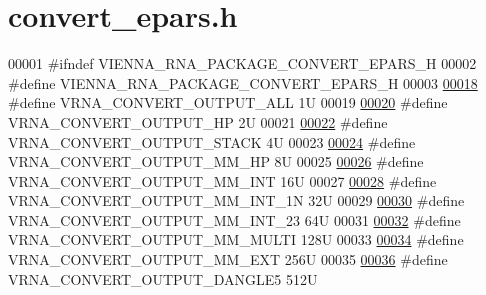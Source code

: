 \hypertarget{convert__epars_8h_source}{}\section{convert\+\_\+epars.\+h}
\label{convert__epars_8h_source}

\begin{DoxyCode}
00001 \textcolor{preprocessor}{#ifndef VIENNA\_RNA\_PACKAGE\_CONVERT\_EPARS\_H}
00002 \textcolor{preprocessor}{#define VIENNA\_RNA\_PACKAGE\_CONVERT\_EPARS\_H}
00003 
\hypertarget{convert__epars_8h_source_l00018}{}\hyperlink{group__energy__parameters__convert_ga8dc6aee5a806c49b71557152f9616bc4}{00018} \textcolor{preprocessor}{#define VRNA\_CONVERT\_OUTPUT\_ALL           1U}
00019 
\hypertarget{convert__epars_8h_source_l00020}{}\hyperlink{group__energy__parameters__convert_gaf66fe2cb11dfcfd32d791049c254a8a4}{00020} \textcolor{preprocessor}{#define VRNA\_CONVERT\_OUTPUT\_HP            2U}
00021 
\hypertarget{convert__epars_8h_source_l00022}{}\hyperlink{group__energy__parameters__convert_gad23522d63f8d4c50d5a5deee9bee3ef2}{00022} \textcolor{preprocessor}{#define VRNA\_CONVERT\_OUTPUT\_STACK         4U}
00023 
\hypertarget{convert__epars_8h_source_l00024}{}\hyperlink{group__energy__parameters__convert_gaa892c7b4957459090f3e08da298cc347}{00024} \textcolor{preprocessor}{#define VRNA\_CONVERT\_OUTPUT\_MM\_HP         8U}
00025 
\hypertarget{convert__epars_8h_source_l00026}{}\hyperlink{group__energy__parameters__convert_ga4ff223fb1f9c62cd92d9ab811ad03d55}{00026} \textcolor{preprocessor}{#define VRNA\_CONVERT\_OUTPUT\_MM\_INT        16U}
00027 
\hypertarget{convert__epars_8h_source_l00028}{}\hyperlink{group__energy__parameters__convert_gaf5d3743219f83c6348155cd81e755bbb}{00028} \textcolor{preprocessor}{#define VRNA\_CONVERT\_OUTPUT\_MM\_INT\_1N     32U}
00029 
\hypertarget{convert__epars_8h_source_l00030}{}\hyperlink{group__energy__parameters__convert_ga78382ec622ba99e0ac2262317bdd7316}{00030} \textcolor{preprocessor}{#define VRNA\_CONVERT\_OUTPUT\_MM\_INT\_23     64U}
00031 
\hypertarget{convert__epars_8h_source_l00032}{}\hyperlink{group__energy__parameters__convert_gae67af9f1cdf7baf2865481282a5d1034}{00032} \textcolor{preprocessor}{#define VRNA\_CONVERT\_OUTPUT\_MM\_MULTI      128U}
00033 
\hypertarget{convert__epars_8h_source_l00034}{}\hyperlink{group__energy__parameters__convert_gaf14ead7ef1fdbe725ade653750fc51e3}{00034} \textcolor{preprocessor}{#define VRNA\_CONVERT\_OUTPUT\_MM\_EXT        256U}
00035 
\hypertarget{convert__epars_8h_source_l00036}{}\hyperlink{group__energy__parameters__convert_ga036ffd996d8c8a9acf631760dd1da24b}{00036} \textcolor{preprocessor}{#define VRNA\_CONVERT\_OUTPUT\_DANGLE5       512U}

\end{DoxyCode}
